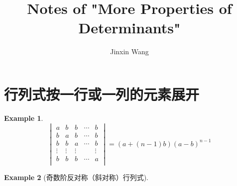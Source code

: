 \documentclass[onecolumn]{ctexart}
\title{Notes of "More Properties of Determinants"}
\author{Jinxin Wang}
\date{}
\newtheorem{example}{Example}
\begin{document}
\maketitle

\section{行列式按一行或一列的元素展开}

\begin{example}
\[
  \begin{vmatrix}
    a & b & b & \cdots & b \\
    b & a & b & \cdots & b \\
    b & b & a & \cdots & b \\
    \vdots & \vdots & \vdots & & \vdots \\
    b & b & b & \cdots & a \\
  \end{vmatrix} = (a + (n - 1)b)(a - b)^{n-1}
\]
\end{example}

\begin{example}[奇数阶反对称（斜对称）行列式]
  
\end{example}
\end{document}

